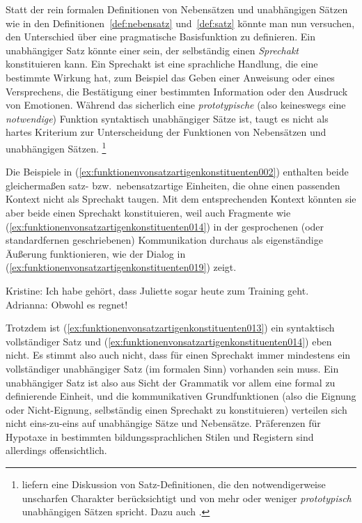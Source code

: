 Statt der rein formalen Definitionen von Nebensätzen und unabhängigen Sätzen wie in den Definitionen~\ref{def:nebensatz} und~\ref{def:satz} könnte man nun versuchen, den Unterschied über eine pragmatische Basisfunktion zu definieren.
Ein unabhängiger Satz könnte einer sein, der selbständig einen \textit{Sprechakt} konstituieren kann.
Ein Sprechakt ist eine sprachliche Handlung, die eine bestimmte Wirkung hat, zum Beispiel das Geben einer Anweisung oder eines Versprechens, die Bestätigung einer bestimmten Information oder den Ausdruck von Emotionen.
Während das sicherlich eine \textit{prototypische} (also keineswegs eine \textit{notwendige}) Funktion syntaktisch unabhängiger Sätze ist, taugt es nicht als hartes Kriterium zur Unterscheidung der Funktionen von Nebensätzen und unabhängigen Sätzen.%
\footnote{\citet{PantherKoepcke2008} liefern eine Diskussion von Satz-Definitionen, die den notwendigerweise unscharfen Charakter berücksichtigt und von mehr oder weniger \textit{prototypisch} unabhängigen Sätzen spricht.
Dazu auch \citet{SchaeferSayatz2016}.}

Die Beispiele in (\ref{ex:funktionenvonsatzartigenkonstituenten002}) enthalten beide gleichermaßen satz- bzw.\ nebensatzartige Einheiten, die ohne einen passenden Kontext nicht als Sprechakt taugen.
Mit dem entsprechenden Kontext könnten sie aber beide einen Sprechakt konstituieren, weil auch Fragmente wie (\ref{ex:funktionenvonsatzartigenkonstituenten014}) in der gesprochenen (oder standardfernen geschriebenen) Kommunikation durchaus als eigenständige Äußerung funktionieren, wie der Dialog in (\ref{ex:funktionenvonsatzartigenkonstituenten019}) zeigt.

\begin{exe}
  \ex\label{ex:funktionenvonsatzartigenkonstituenten012}
  \begin{xlist}
  \end{xlist}
  \ex\label{ex:funktionenvonsatzartigenkonstituenten019} Kristine: Ich habe gehört, dass Juliette sogar heute zum Training geht.\\
  Adrianna: Obwohl es regnet!
\end{exe}

Trotzdem ist (\ref{ex:funktionenvonsatzartigenkonstituenten013}) ein syntaktisch vollständiger Satz und (\ref{ex:funktionenvonsatzartigenkonstituenten014}) eben nicht.
Es stimmt also auch nicht, dass für einen Sprechakt immer mindestens ein vollständiger unabhängiger Satz (im formalen Sinn) vorhanden sein muss.
Ein unabhängiger Satz ist also aus Sicht der Grammatik vor allem eine formal zu definierende Einheit, und die kommunikativen Grundfunktionen (also die Eignung oder Nicht-Eignung, selbständig einen Sprechakt zu konstituieren) verteilen sich nicht eins-zu-eins auf unabhängige Sätze und Nebensätze.
Präferenzen für Hypotaxe in bestimmten bildungssprachlichen Stilen und Registern sind allerdings offensichtlich.


